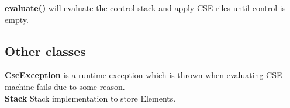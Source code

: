 \documentclass[12pt,a4paper]{article}
\begin{document}
\textbf{evaluate()} will evaluate the control stack and apply CSE riles until control is empty.

\subsection{Other classes}

\textbf{CseException} is a runtime exception which is thrown when evaluating CSE machine fails due to some reason.\\

\textbf{Stack} Stack implementation to store Elements.\\
\end{document}
